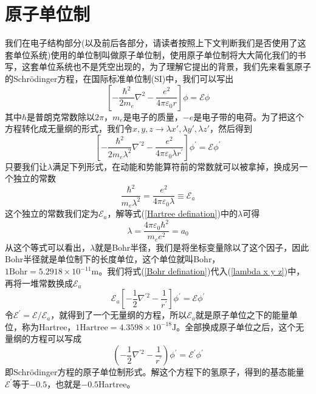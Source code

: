 \documentclass[12pt,a4paper,openany,twoside]{book}
\numberwithin{equation}{section}
\begin{document}
  \section{原子单位制}
    我们在电子结构部分(以及前后各部分，请读者按照上下文判断我们是否使用了这套单位系统)使用的单位制叫做原子单位制，使用原子单位制将大大简化我们的书写，这套单位系统也不是凭空出现的，为了理解它提出的背景，我们先来看氢原子的Schr\"odinger方程，在国际标准单位制(SI)中，我们可以写出
    \begin{equation}
      \left[ - \frac { \hbar ^ { 2 } } { 2 m _ { e } } \nabla ^ { 2 } - \frac { e ^ { 2 } } { 4 \pi \varepsilon _ { 0 } r } \right] \phi = \mathscr { E } \phi
    \end{equation}
    其中$\hbar$是普朗克常数除以$2\pi$，$m_e$是电子的质量，$-e$是电子带的电荷。为了把这个方程转化成无量纲的形式，我们令$x,y,z\rightarrow\lambda x',\lambda y',\lambda z'$，然后得到
    \begin{equation}
        \left[ - \frac { \hbar ^ { 2 } } { 2 m _ { e } \lambda ^ { 2 } } \nabla ^ { \prime 2 } - \frac { e ^ { 2 } } { 4 \pi \varepsilon _ { 0 } \lambda r ^ { \prime } } \right] \phi ^ { \prime } = \mathscr { E } \phi ^ { \prime }
        \label{lambda x y z}
    \end{equation}
    只要我们让$\lambda$满足下列形式，在动能和势能算符前的常数就可以被拿掉，换成另一个独立的常数
    \begin{equation}
        \frac { \hbar ^ { 2 } } { m _ { e } \lambda ^ { 2 } } = \frac { e ^ { 2 } } { 4 \pi \varepsilon _ { 0 } \lambda }\equiv \mathscr { E } _ { a }
        \label{Hartree defination}
    \end{equation}
    这个独立的常数我们定为$ \mathscr { E } _ { a }$，解等式(\ref{Hartree defination})中的$\lambda$可得
    \begin{equation}
      \lambda=\frac{4\pi\varepsilon_0\hbar^2}{m_e e^2}=a_0
      \label{Bohr defination}
    \end{equation}
    从这个等式可以看出，$\lambda$就是Bohr半径，我们是将坐标变量除以了这个因子，因此Bohr半径就是单位制下的长度单位，这个单位就叫Bohr，$1 \text{Bohr} = 5.2918 \times 10^{-11} \textrm{m}$。我们将式(\ref{Bohr defination})代入(\ref{lambda x y z})中，再将一堆常数换成$\mathscr{E}_a$
    \begin{equation}
      \mathscr { E } _ { a } \left[ - \frac { 1 } { 2 } \nabla ^ { \prime 2 } - \frac { 1 } { r ^ { \prime } } \right] \phi ^ { \prime } = \mathscr { E } \phi ^ { \prime }
    \end{equation}
    令$\mathscr{E}^{\prime}=\mathscr{E}/\mathscr{E}_a$，就得到了一个无量纲的方程，所以$\mathscr{E}_a$就是原子单位之下的能量单位，称为Hartree，$1 \text{Hartree} = 4.3598 \times 10^{-18} \textrm{J}$。全部换成原子单位之后，这个无量纲的方程可以写成
    \begin{equation}
      \left( - \frac { 1 } { 2 } \nabla ^ { \prime 2 } - \frac { 1 } { r ^ { \prime } } \right) \phi ^ { \prime } = \mathscr { E } ^ { \prime } \phi ^ { \prime }
    \end{equation}
    即Schr\"odinger方程的原子单位制形式。解这个方程下的氢原子，得到的基态能量$\mathscr{E}^{\prime}$等于$-0.5$，也就是$-0.5$Hartree。
\end{document}
